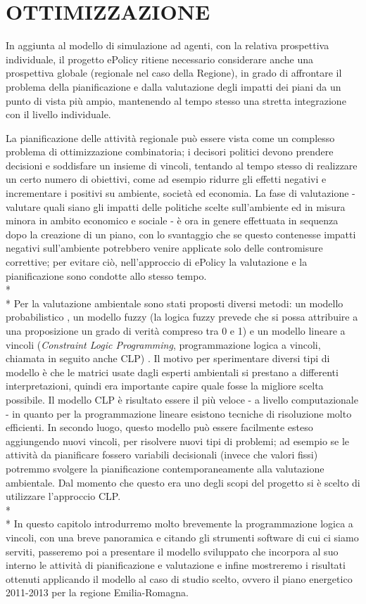 \documentclass[12pt,a4paper,openright,twoside]{report}
\begin{document}
\chapter{\nohyphens{OTTIMIZZAZIONE}}
In aggiunta al modello di simulazione ad agenti, con la relativa prospettiva individuale, il progetto ePolicy ritiene necessario considerare anche una prospettiva globale (regionale nel caso della Regione), in grado di affrontare il problema della pianificazione e dalla valutazione degli impatti dei piani da un punto di vista più ampio, mantenendo al tempo stesso una stretta integrazione con il livello individuale.

La pianificazione delle attività regionale può essere vista come un complesso problema di ottimizzazione combinatoria; i decisori politici devono prendere decisioni e soddisfare un insieme di vincoli, tentando al tempo stesso di realizzare un certo numero di obiettivi, come ad esempio ridurre gli effetti negativi e incrementare i positivi su ambiente, società ed economia. La fase di valutazione - valutare quali siano gli impatti delle politiche scelte sull'ambiente ed in misura minora in ambito economico e sociale - è ora in genere effettuata in sequenza dopo la creazione di un piano, con lo svantaggio che se questo contenesse impatti negativi sull'ambiente potrebbero venire applicate solo delle contromisure correttive; per evitare ciò, nell'approccio di ePolicy la valutazione e la pianificazione sono condotte allo stesso tempo.\\*\\*
Per la valutazione ambientale sono stati proposti diversi metodi: un modello probabilistico \cite{logicDSSstrategicAss}, un modello fuzzy (la logica fuzzy prevede che si possa attribuire a una proposizione un grado di verità compreso tra 0 e 1) \cite{fuzzyLogicstrategicAss} e un modello lineare a vincoli (\emph{Constraint Logic Programming}, programmazione logica a vincoli, chiamata in seguito anche CLP) \cite{GavanelliEtAl}. Il motivo per sperimentare diversi tipi di modello è che le matrici usate dagli esperti ambientali si prestano a differenti interpretazioni, quindi era importante capire quale fosse la migliore scelta possibile. Il modello CLP è risultato essere il più veloce - a livello computazionale - in quanto per la programmazione lineare esistono tecniche di risoluzione molto efficienti. In secondo luogo, questo modello può essere facilmente esteso aggiungendo nuovi vincoli, per risolvere nuovi tipi di problemi; ad esempio se le attività da pianificare fossero variabili decisionali (invece che valori fissi) potremmo svolgere la pianificazione contemporaneamente alla valutazione ambientale. Dal momento che questo era uno degli scopi del progetto si è scelto di utilizzare l'approccio CLP.\\*\\*
In questo capitolo introdurremo molto brevemente la programmazione logica a vincoli, con una breve panoramica e citando gli strumenti software di cui ci siamo serviti, passeremo poi a presentare il modello sviluppato che incorpora al suo interno le attività di pianificazione e valutazione e infine mostreremo i risultati ottenuti applicando il modello al caso di studio scelto, ovvero il piano energetico 2011-2013 per la regione Emilia-Romagna.
\end{document}
